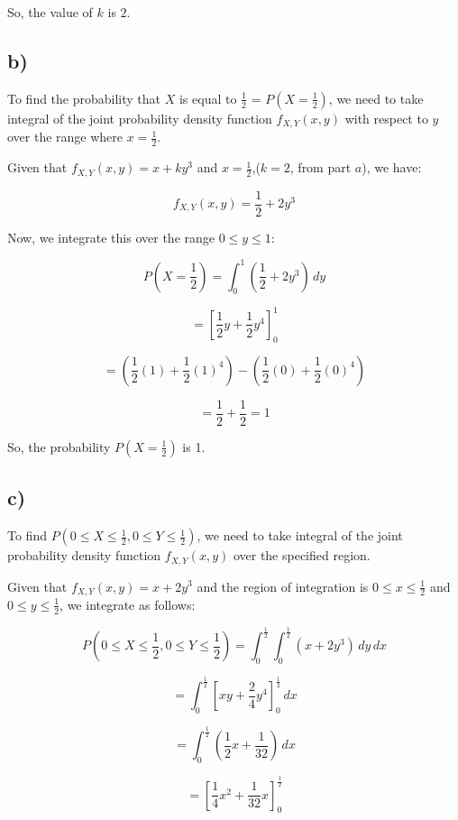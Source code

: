 \documentclass[12pt]{article}
\begin{document}
So, the value of $k$ is $2$.

\subsection*{b)}

To find the probability that \( X \) is equal to \( \frac{1}{2} \) = \( P(X = \frac{1}{2}) \), we need to take integral of the joint probability density function \( f_{X,Y}(x, y) \) with respect to \( y \) over the range where \( x = \frac{1}{2} \).

Given that \( f_{X,Y}(x, y) = x + ky^3 \) and \( x = \frac{1}{2} \),(\( k = 2 \), from part $a$), we have:

\[
f_{X,Y}(x, y) = \frac{1}{2} + 2y^3
\]

Now, we integrate this over the range \( 0 \leq y \leq 1 \):

\[
P(X = \frac{1}{2}) = \int_{0}^{1} \left(\frac{1}{2} + 2y^3\right) \, dy
\]

\[
= \left[\frac{1}{2}y + \frac{1}{2}y^4\right]_{0}^{1}
\]

\[
= \left(\frac{1}{2}(1) + \frac{1}{2}(1)^4\right) - \left(\frac{1}{2}(0) + \frac{1}{2}(0)^4\right)
\]

\[
= \frac{1}{2} + \frac{1}{2} = 1
\]

So, the probability \( P(X = \frac{1}{2}) \) is 1.

\subsection*{c)} 

To find \( P(0 \leq X \leq \frac{1}{2}, 0 \leq Y \leq \frac{1}{2}) \), we need to take integral of the joint probability density function \( f_{X,Y}(x, y) \) over the specified region.

Given that \( f_{X,Y}(x, y) = x + 2y^3 \) and the region of integration is \( 0 \leq x \leq \frac{1}{2} \) and \( 0 \leq y \leq \frac{1}{2} \), we integrate as follows:

\[
P(0 \leq X \leq \frac{1}{2}, 0 \leq Y \leq \frac{1}{2}) = \int_{0}^{\frac{1}{2}} \int_{0}^{\frac{1}{2}} (x + 2y^3) \, dy \, dx
\]

\[
= \int_{0}^{\frac{1}{2}} \left[ xy + \frac{2}{4}y^4 \right]_{0}^{\frac{1}{2}} \, dx
\]

\[
= \int_{0}^{\frac{1}{2}} \left( \frac{1}{2}x + \frac{1}{32} \right) \, dx
\]

\[
= \left[ \frac{1}{4}x^2 + \frac{1}{32}x \right]_{0}^{\frac{1}{2}}
\]
\end{document}

